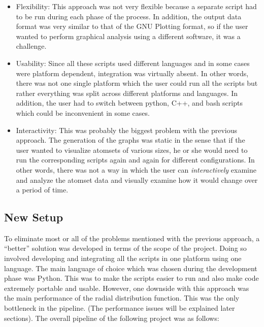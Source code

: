 \begin{itemize}
    \item Flexibility: This approach was not very flexible because a separate script had to be run during each phase of the process. In addition, the output data format was very similar to that of the GNU Plotting format, so if the user wanted to perform graphical analysis using a different software, it was a challenge.
    
    \item Usability: Since all these scripts used different languages and in some cases were platform dependent, integration was virtually absent. In other words, there was not one single platform which the user could run all the scripts but rather everything was split across different platforms and languages. In addition, the user had to switch between python, C++, and bash scripts which could be inconvenient in some cases. 
    
    \item Interactivity: This was probably the biggest problem with the previous approach. The generation of the graphs was static in the sense that if the user wanted to visualize atomsets of various sizes, he or she would need to run the corresponding scripts again and again for different configurations. In other words, there was not a way in which the user can \textit{interactively} examine and analyze the atomset data and visually examine how it would change over a period of time.
\end{itemize}

\subsection*{New Setup}

To eliminate most or all of the problems mentioned with the previous approach, a ``better'' solution was developed in terms of the scope of the project. Doing so involved developing and integrating all the scripts in one platform using one language. The main language of choice which was chosen during the development phase was Python. This was to make the scripts easier to run and also make code extremely portable and usable. However, one downside with this approach was the main performance of the radial distribution function. This was the only bottleneck in the pipeline. (The performance issues will be explained later sections). The overall pipeline of the following project was as follows:






